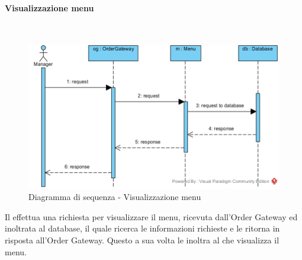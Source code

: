 \begin{samepage}
\paragraph{Visualizzazione menu}\mbox{}\\
\end{samepage}
\begin{figure}[H]
	\centering
	\includegraphics[width=15cm]{../../documenti/SpecificaTecnica/diagrammi/sequenza/direttore_visualizza_menu.png}
	\caption{Diagramma di sequenza - Visualizzazione menu}
\end{figure}
Il \Manager{} effettua una richiesta per visualizzare il menu, ricevuta dall'Order Gateway ed inoltrata al database, il quale ricerca le informazioni richieste e le ritorna in risposta all'Order Gateway. Questo a sua volta le inoltra al \Manager{} che visualizza il menu.

